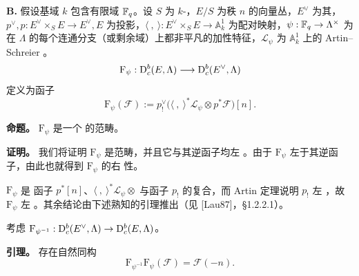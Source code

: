 \par\medskip\noindent\textbf{B.} 假设基域 $k$ 包含有限域 $\mathbb F_q$。设 $S$ 为 $k$-，$E/S$ 为秩 $n$ 的向量丛，$E^\vee$ 为其，$p^\vee,p:E^\vee\times_SE\to E^\vee,E$ 为投影，$\langle\ ,\ \rangle:E^\vee\times_SE\to\mathbb A_k^1$ 为配对映射，$\psi:\mathbb F_q\to\Lambda^\times$ 为在 $\Lambda$ 的每个连通分支（或剩余域）上都非平凡的加性特征，$\mathcal L_\psi$ 为 $\mathbb A_k^1$ 上的 Artin--Schreier 。
\[
\mathrm F_\psi:\mathrm{D}_c^b(E,\Lambda)\longrightarrow\mathrm{D}_c^b(E^\vee,\Lambda)
\]
定义为函子
\[
\mathrm F_\psi(\mathcal F):=p_!^\vee
\bigl(\langle\ ,\ \rangle^*\mathcal L_\psi\otimes p^*\mathcal F\bigr)[n].
\]

\par\medskip\noindent\textbf{命题。} $\mathrm F_\psi$ 是一个 的范畴。

\noindent\textbf{证明。} 我们将证明 $\mathrm F_\psi$ 是范畴，并且它与其逆函子均左 。由于 $\mathrm F_\psi$ 左于其逆函子，由此也就得到 $\mathrm F_\psi$ 的右 性。

$\mathrm F_\psi$ 是 函子 $p^*[n]$、$\langle\ ,\ \rangle^*\mathcal L_\psi\otimes$ 与函子 $p_!$ 的复合，而 Artin 定理说明 $p_!$ 左 ，故 $\mathrm F_\psi$ 左 。其余结论由下述熟知的引理推出（见 [Lau87]，\S 1.2.2.1）。

考虑  $\mathrm F_{\psi^{-1}}:\mathrm{D}_c^b(E^\vee,\Lambda)\to\mathrm{D}_c^b(E,\Lambda)$。

\par\medskip\noindent\textbf{引理。} 存在自然同构
\[
\mathrm F_{\psi^{-1}}\mathrm F_\psi(\mathcal F)=\mathcal F(-n).
\]

